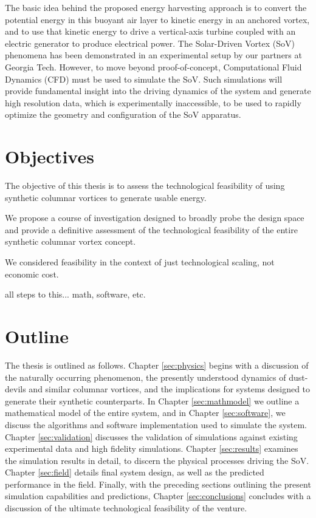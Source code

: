 The basic idea behind the proposed energy harvesting approach is to convert the 
potential energy in this buoyant air layer to kinetic energy in an
anchored vortex, and to use that kinetic energy to drive a
vertical-axis turbine coupled with an electric generator  to
produce electrical power. 
The Solar-Driven Vortex (SoV) phenomena has been demonstrated in
an experimental setup by our partners at Georgia Tech. However, to 
move beyond proof-of-concept, Computational Fluid 
Dynamics (CFD) must be used to simulate the SoV. Such simulations will 
provide fundamental insight into the 
driving dynamics of the system and generate high resolution data, which is
experimentally inaccessible, to be used to rapidly optimize the
geometry and configuration of the SoV apparatus. 


%
%

\section{Objectives}

The objective of this thesis is to assess the technological feasibility of 
using synthetic columnar vortices to generate usable energy. 

We propose a course of investigation designed to broadly probe the
design space and provide a definitive assessment of the technological
feasibility of the entire synthetic columnar vortex concept. 

We considered feasibility in the context of just technological scaling,
not economic cost.  

all steps to this... math, software, etc. 

\section{Outline}

The thesis is outlined as follows. Chapter \ref{sec:physics} begins
with a discussion of the naturally occurring phenomenon, the presently
understood dynamics of dust-devils and similar columnar vortices, and
the implications for systems designed to generate their synthetic
counterparts.  
In Chapter \ref{sec:mathmodel} we outline a mathematical model of
the entire system, and in Chapter \ref{sec:software}, we discuss the
algorithms and software implementation used to simulate the
system. Chapter \ref{sec:validation} discusses the 
validation of simulations against existing experimental data and high
fidelity simulations. 
Chapter \ref{sec:results} examines the simulation results in detail, to
discern the physical processes driving the SoV.   
Chapter \ref{sec:field} details final system
design, as well as the predicted performance in the field. 
%
%
%
Finally, with the preceding sections outlining the present simulation
capabilities and predictions, Chapter \ref{sec:conclusions} concludes
with a discussion of the ultimate technological feasibility of the
venture. 

%
